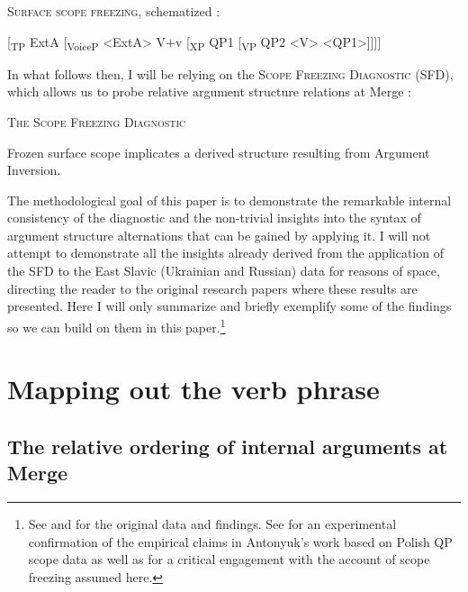 \documentclass[output=paper,colorlinks,citecolor=brown]{langscibook}
\begin{document}
\ea%
    \label{ex:antonyuk:18}

          \textsc{Surface scope freezing}, schematized%
          :{}



[\textsubscript{TP} ExtA\textbf{ }[\textsubscript{VoiceP} <ExtA> V$+$v [\textsubscript{XP} QP1 [\textsubscript{VP} QP2  <V>\textbf{  }<QP1>]]]]
    \z



\noindent In what follows then, I will be relying on the \textsc{Scope} \textsc{Freezing} \textsc{Diagnostic} (SFD), which allows us to probe relative argument structure relations at Merge \citep{Antonyuk2015}:

\eanoraggedright%
    \label{ex:antonyuk:19}

           \textsc{The Scope Freezing Diagnostic}

Frozen surface scope implicates a derived structure resulting from Argument Inversion.
    \z

\noindent The methodological goal of this paper is to demonstrate the remarkable internal consistency of the diagnostic and the non-trivial insights into the syntax of argument structure alternations that can be gained by applying it. I will not attempt to demonstrate all the insights already derived from the application of the SFD to the East Slavic (Ukrainian and Russian) data for reasons of space, directing the reader to the original research papers where these results are presented. Here I will only summarize and briefly exemplify some of the findings so we can build on them in this paper.\footnote{See \citet{Antonyuk2015, Antonyuk2020, Antonyuk2023,AntonyukUnderReview} and \citet{AntonyukMykhaylyk2022} for the original data and findings. See \citet{AbelsGrabska2022} for an experimental confirmation of the empirical claims in Antonyuk’s work based on Polish QP scope data as well as for a critical engagement with the account of scope freezing assumed here.}

\section{Mapping out the verb phrase}\label{sec:antonyuk:3}

\subsection{The relative ordering of internal arguments at Merge}
\label{sec:antonyuk:3.1}
\end{document}

